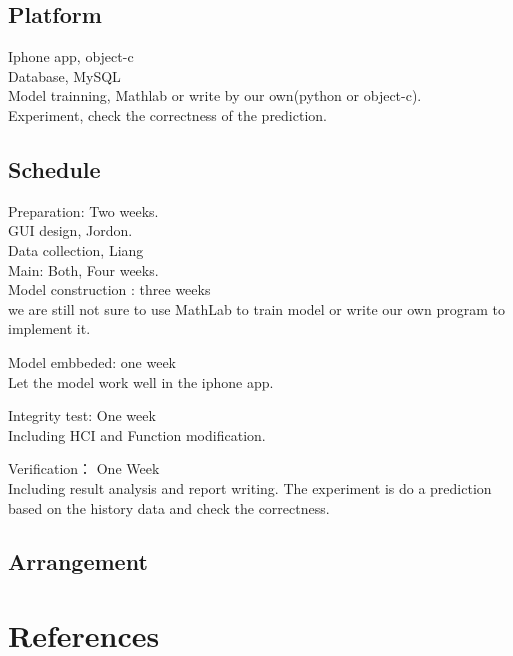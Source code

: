 \documentclass[12pt]{article}
\begin{document}
\subsection{Platform}
Iphone app, object-c\\
Database, MySQL\\
Model trainning, Mathlab or write by our own(python or object-c).\\
Experiment, check the correctness of the prediction.\\

\subsection{Schedule}
Preparation: Two weeks.\\
    GUI design, Jordon. \\
    Data collection, Liang\\

Main: Both, Four weeks.\\
    Model construction : three weeks\\  
    we are still not sure to use MathLab to train model or write our
    own program to implement it.

    Model embbeded: one week\\
    Let the model work well in the iphone app.

Integrity test: One week\\
    Including HCI and Function modification. 

Verification： One Week\\
    Including result analysis and report writing. The experiment is do
    a prediction based on the history data and check the correctness.

\subsection{Arrangement}
  \begin{gantt}{7}{8}
    \begin{ganttitle}
    \end{ganttitle}
  \end{gantt}


\section{References}

\end{document}
